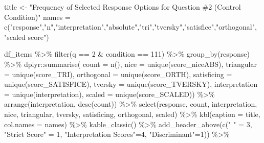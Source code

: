\documentclass[
  letterpaper,
  DIV=11,
  numbers=noendperiod]{scrreprt}
\newenvironment{Shaded}{\begin{snugshade}}{\end{snugshade}}
\newcommand{\AttributeTok}[1]{\textcolor[rgb]{0.40,0.45,0.13}{#1}}
\newcommand{\DecValTok}[1]{\textcolor[rgb]{0.68,0.00,0.00}{#1}}
\newcommand{\FunctionTok}[1]{\textcolor[rgb]{0.28,0.35,0.67}{#1}}
\newcommand{\NormalTok}[1]{\textcolor[rgb]{0.00,0.23,0.31}{#1}}
\newcommand{\OtherTok}[1]{\textcolor[rgb]{0.00,0.23,0.31}{#1}}
\newcommand{\SpecialCharTok}[1]{\textcolor[rgb]{0.37,0.37,0.37}{#1}}
\newcommand{\StringTok}[1]{\textcolor[rgb]{0.13,0.47,0.30}{#1}}
\begin{document}
\begin{Shaded}
\begin{Highlighting}[]
\NormalTok{title }\OtherTok{\textless{}{-}} \StringTok{"Frequency of Selected Response Options for Question \#2 (Control Condition)"}
\NormalTok{names }\OtherTok{=} \FunctionTok{c}\NormalTok{(}\StringTok{"response"}\NormalTok{,}\StringTok{"n"}\NormalTok{,}\StringTok{"interpretation"}\NormalTok{,}\StringTok{"absolute"}\NormalTok{,}\StringTok{"tri"}\NormalTok{,}\StringTok{"tversky"}\NormalTok{,}\StringTok{"satisfice"}\NormalTok{,}\StringTok{"orthogonal"}\NormalTok{, }\StringTok{"scaled score"}\NormalTok{)}

\NormalTok{df\_items }\SpecialCharTok{\%\textgreater{}\%} \FunctionTok{filter}\NormalTok{(q }\SpecialCharTok{==} \DecValTok{2} \SpecialCharTok{\&}\NormalTok{ condition }\SpecialCharTok{==} \DecValTok{111}\NormalTok{) }\SpecialCharTok{\%\textgreater{}\%} \FunctionTok{group\_by}\NormalTok{(response) }\SpecialCharTok{\%\textgreater{}\%} 
\NormalTok{  dplyr}\SpecialCharTok{::}\FunctionTok{summarise}\NormalTok{( }\AttributeTok{count =} \FunctionTok{n}\NormalTok{(), }
                    \AttributeTok{nice =} \FunctionTok{unique}\NormalTok{(score\_niceABS),}
                    \AttributeTok{triangular =} \FunctionTok{unique}\NormalTok{(score\_TRI), }
                    \AttributeTok{orthogonal =}  \FunctionTok{unique}\NormalTok{(score\_ORTH),}
                    \AttributeTok{satisficing =}  \FunctionTok{unique}\NormalTok{(score\_SATISFICE),}
                    \AttributeTok{tversky =} \FunctionTok{unique}\NormalTok{(score\_TVERSKY),}
                    \AttributeTok{interpretation =} \FunctionTok{unique}\NormalTok{(interpretation),}
                    \AttributeTok{scaled =} \FunctionTok{unique}\NormalTok{(score\_SCALED)) }\SpecialCharTok{\%\textgreater{}\%} 
  \FunctionTok{arrange}\NormalTok{(interpretation, }\FunctionTok{desc}\NormalTok{(count)) }\SpecialCharTok{\%\textgreater{}\%} 
  \FunctionTok{select}\NormalTok{(response, count, interpretation, nice, }
\NormalTok{         triangular, tversky, satisficing, orthogonal, scaled) }\SpecialCharTok{\%\textgreater{}\%} 
  \FunctionTok{kbl}\NormalTok{(}\AttributeTok{caption =}\NormalTok{ title, }\AttributeTok{col.names =}\NormalTok{ names) }\SpecialCharTok{\%\textgreater{}\%}  \FunctionTok{kable\_classic}\NormalTok{() }\SpecialCharTok{\%\textgreater{}\%} 
  \FunctionTok{add\_header\_above}\NormalTok{(}\FunctionTok{c}\NormalTok{(}\StringTok{" "} \OtherTok{=} \DecValTok{3}\NormalTok{, }\StringTok{"Strict Score"} \OtherTok{=} \DecValTok{1}\NormalTok{, }\StringTok{"Interpretation Scores"}\OtherTok{=}\DecValTok{4}\NormalTok{, }\StringTok{"Discriminant"}\OtherTok{=}\DecValTok{1}\NormalTok{)) }\SpecialCharTok{\%\textgreater{}\%}

\end{Highlighting}
\end{Shaded}
\end{document}
